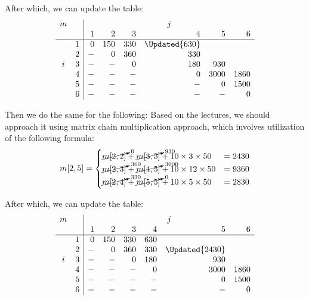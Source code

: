 After which, we can update the table:
\[
\begin{array}{cc|rrrrrr}
m &   & \multicolumn{6}{c}{j}                          \\
  &   &  1   &  2  &  3  &       4       &   5  &   6  \\
\hline
  & 1 &  0   & 150 & 330 & \Updated{630} &      &      \\
  & 2 &  -   &  0  & 360 &      330      &      &      \\
i & 3 &  -   &  -  &  0  &      180      &  930 &      \\
  & 4 &  -   &  -  &  -  &       0       & 3000 & 1860 \\
  & 5 &  -   &  -  &  -  &       -       &   0  & 1500 \\
  & 6 &  -   &  -  &  -  &       -       &   -  &   0
\end{array}
\]

Then we do the same for the following:
Based on the lectures, we should approach it using matrix chain multiplication
approach, which involves utilization of the following formula:
$$
    m[2, 5] =
    \begin{cases}
        \cancelto{0}{m[2, 2]}   + \cancelto{930}{m[3, 5]}  + 10 \times  3 \times 50  & = 2430 \\
        \cancelto{360}{m[2, 3]} + \cancelto{3000}{m[4, 5]} + 10 \times 12 \times 50  & = 9360 \\
        \cancelto{330}{m[2, 4]} + \cancelto{0}{m[5, 5]}    + 10 \times  5 \times 50  & = 2830
    \end{cases}
$$

After which, we can update the table:
\[
\begin{array}{cc|rrrrrr}
m &   & \multicolumn{6}{c}{j}                          \\
  &   &  1   &  2  &  3  &  4  &       5        &   6  \\
\hline
  & 1 &  0   & 150 & 330 & 630 &                &      \\
  & 2 &  -   &  0  & 360 & 330 & \Updated{2430} &      \\
i & 3 &  -   &  -  &  0  & 180 &      930       &      \\
  & 4 &  -   &  -  &  -  &  0  &     3000       & 1860 \\
  & 5 &  -   &  -  &  -  &  -  &       0        & 1500 \\
  & 6 &  -   &  -  &  -  &  -  &       -        &   0
\end{array}
\]

